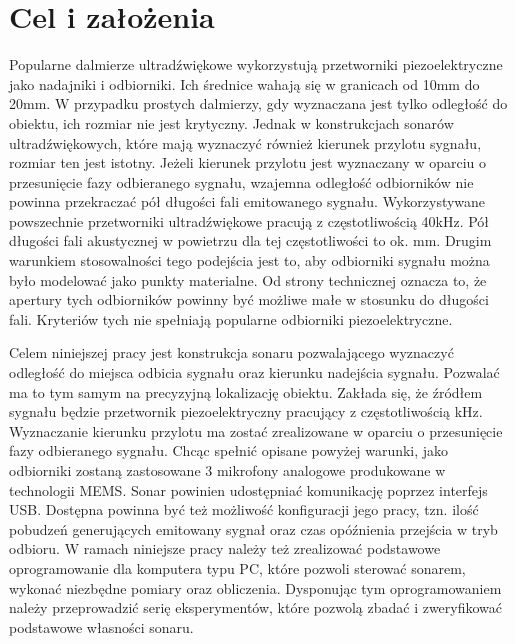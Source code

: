 \chapter{Cel i założenia}\label{chapter:ch_02}

Popularne dalmierze ultradźwiękowe wykorzystują przetworniki piezoelektryczne
jako nadajniki i odbiorniki. Ich średnice wahają się w granicach
od 10mm do 20mm.
W przypadku prostych dalmierzy, gdy wyznaczana jest tylko odległość do
obiektu, ich rozmiar nie jest krytyczny.
Jednak w konstrukcjach sonarów ultradźwiękowych, które mają wyznaczyć
również kierunek przylotu sygnału, rozmiar ten jest istotny.
Jeżeli kierunek przylotu jest wyznaczany w oparciu o przesunięcie
fazy odbieranego sygnału, wzajemna odległość odbiorników nie powinna
przekraczać pół długości fali emitowanego sygnału.
Wykorzystywane powszechnie przetworniki ultradźwiękowe pracują z częstotliwością
40kHz. Pół długości fali akustycznej w powietrzu dla tej częstotliwości
to ok. \unit[4,3]{mm}. Drugim warunkiem stosowalności tego podejścia
jest to, aby odbiorniki sygnału można było modelować jako punkty materialne.
Od strony technicznej oznacza to, że apertury tych odbiorników powinny być
możliwe małe w stosunku do długości fali.
Kryteriów tych nie spełniają popularne odbiorniki piezoelektryczne.

Celem niniejszej pracy jest konstrukcja sonaru pozwalającego wyznaczyć
odległość do miejsca odbicia sygnału oraz kierunku nadejścia sygnału.
Pozwalać ma to tym samym na precyzyjną lokalizację obiektu.
Zakłada się, że źródłem sygnału będzie przetwornik piezoelektryczny
pracujący z częstotliwością \unit[40]{kHz}.
Wyznaczanie kierunku przylotu ma zostać zrealizowane w oparciu
o przesunięcie fazy odbieranego sygnału. Chcąc spełnić opisane powyżej
warunki, jako odbiorniki zostaną zastosowane 3 mikrofony analogowe
produkowane w technologii MEMS.
Sonar powinien udostępniać komunikację poprzez interfejs USB.
Dostępna powinna być też możliwość konfiguracji jego pracy,
tzn. ilość pobudzeń generujących emitowany sygnał oraz czas opóźnienia
przejścia w tryb odbioru.
W ramach niniejsze pracy należy też zrealizować podstawowe oprogramowanie
dla komputera typu PC, które pozwoli sterować sonarem, wykonać
niezbędne pomiary oraz obliczenia. Dysponując tym oprogramowaniem
należy przeprowadzić serię eksperymentów, które pozwolą zbadać i zweryfikować
podstawowe własności sonaru. 
